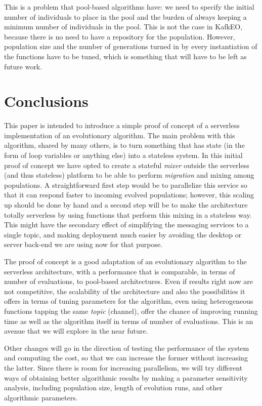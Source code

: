 \documentclass[sigconf]{acmart}
\begin{document}
This is a problem that pool-based algorithms have: we need to
specify the initial number of individuals to place in the pool and the
burden of always keeping a minimum number of individuals in the pool. This
is not the case in KafkEO, because there is no need to have a
repository for the population. However, population size and the number
of generations turned in by every instantiation of the functions have
to be tuned, which is something that will have to be left as future
work.


\section{Conclusions}
\label{sec:con}


This paper is intended to introduce a simple proof of concept of a
serverless implementation of an evolutionary algorithm. The main
problem with this algorithm, shared by many others, is to turn
something that has state (in the form of loop variables or anything
else) into a stateless system. In this initial proof of concept we have
opted to create a stateful {\em mixer} outside the serverless (and
thus stateless) platform to be able to perform {\em
  migration} and mixing among populations. A straightforward first step
would be to parallelize this service so that it can respond faster to
incoming evolved populations; however, this scaling up should be done
by hand and a second step will be to make the architecture totally
serverless by using functions that perform this mixing in a stateless
way. This might have the secondary effect of simplifying the messaging
services to a single topic, and making deployment much easier by
avoiding the desktop or server back-end we are using now for that
purpose.

The proof of concept is a good adaptation of an evolutionary algorithm
to the serverless architecture, with a performance that is comparable,
in terms of number of evaluations, to pool-based architectures. Even
if results right now are not competitive, the scalability of the
architecture and also the possibilities it offers in terms of tuning
parameters for the algorithm, even using heterogeneous functions
tapping the same {\em topic} (channel), offer the chance of improving
running time as well as the algorithm itself in terms of number of
evaluations. This is an avenue that we will explore in the near
future. 

Other changes will go in the direction of testing the performance of
the system and computing the cost, so that we can increase the former
without increasing the latter. Since there is room for increasing
parallelism, we will try different ways of obtaining better
algorithmic results by making a parameter sensitivity analysis,
including population size, length of evolution runs, and other
algorithmic parameters.
\end{document}
